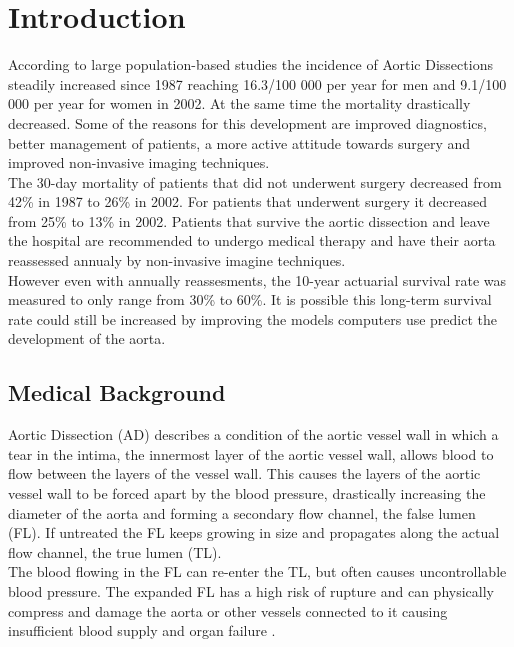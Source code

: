 \documentclass[thesis.tex]{subfiles}
\begin{document}
\chapter{Introduction}
\label{chap:introduction}


According to large population-based studies the incidence of Aortic Dissections steadily increased since 1987 reaching 16.3/100 000 per year for men and 9.1/100 000 per year for women in 2002. At the same time the mortality drastically decreased. Some of the reasons for this development are improved diagnostics, better management of patients, a more active attitude towards surgery and improved non-invasive imaging techniques. \\
The 30-day mortality of patients that did not underwent surgery decreased from 42\% in 1987 to 26\% in 2002. For patients that underwent surgery it decreased from 25\% to 13\% in 2002. Patients that survive the aortic dissection and leave the hospital are recommended to undergo medical therapy and have their aorta reassessed annualy by non-invasive imagine techniques. \\ However even with annually reassesments, the 10-year actuarial survival rate was measured to only range from 30\% to 60\%. It is possible this long-term survival rate could still be increased by improving the models computers use predict the development of the aorta.
\\


  
\section{Medical Background}
Aortic Dissection (AD) describes a condition of the aortic vessel wall in which a tear in the intima, the innermost layer of the aortic vessel wall, allows blood to flow between the layers of the vessel wall. This causes the layers of the aortic vessel wall to be forced apart by the blood pressure, drastically increasing the diameter of the aorta and forming a secondary flow channel, the false lumen (FL). If untreated the FL keeps growing in size and propagates along the actual flow channel, the true lumen (TL). \\
The blood flowing in the FL can re-enter the TL, but often causes uncontrollable blood pressure. The expanded FL has a high risk of rupture and can physically compress\cite{criado2011aortic} and damage the aorta or other vessels connected to it causing insufficient blood supply and organ failure \cite{meszaros2000epidemiology,desanctis1987aortic}. 
\end{document}
